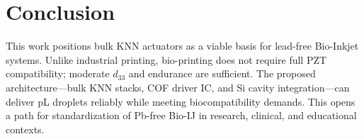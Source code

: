 \section{Conclusion}
This work positions bulk KNN actuators as a viable basis for
lead-free Bio-Inkjet systems.
Unlike industrial printing, bio-printing does not require full PZT
compatibility; moderate $d_{33}$ and endurance are sufficient.
The proposed architecture---bulk KNN stacks, COF driver IC, and Si
cavity integration---can deliver pL droplets reliably while meeting
biocompatibility demands.
This opens a path for standardization of Pb-free Bio-IJ in research,
clinical, and educational contexts.
